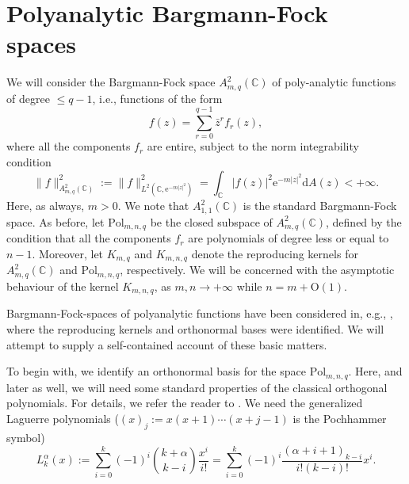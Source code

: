 \documentclass{birkart}
\theoremstyle{definition}
\theoremstyle{remark}
\numberwithin{equation}{section}
\numberwithin{figure}{section}
\newcommand{\e}{\mathrm e}
\newcommand{\1}{{\mathbf 1}}
\newcommand{\Rpar}{q}
\newcommand{\C}{{\mathbb C}}
\newcommand{\Ordo}{\mathrm{O}}
\newcommand{\diff}{{\mathrm d}}
\begin{document}
\section{Polyanalytic Bargmann-Fock spaces}
\label{sec-polybargmann}

We will consider the Bargmann-Fock space $A^2_{m,\Rpar}(\C)$ of poly-analytic 
functions of degree $\le \Rpar-1$, i.e., functions of the form 
\[
f(z) = \sum_{r=0}^{\Rpar-1} \bar{z}^r f_r(z),
\]
where all the components $f_r$ are entire, subject to the norm integrability 
condition 
\[
\|f\|^2_{A^2_{m,\Rpar}(\C)}:=
\|f\|^2_{L^2(\C,\e^{-m|z|^2})}
=\int_{\C} |f(z)|^2 \e^{-m|z|^2} \diff A(z)<+\infty.
\] 
Here, as always, $m>0$. We note that $A^2_{1,1}(\C)$ is the standard 
Bargmann-Fock space. As before, let $\mathrm{Pol}_{m,n,\Rpar}$ be the 
closed subspace of $A^2_{m,\Rpar}(\C)$, defined by the condition that all the 
components $f_r$ are polynomials of degree less or equal to $n-1$.
Moreover, let $K_{m,\Rpar}$ and $K_{m,n,\Rpar}$ denote the reproducing kernels 
for $A^2_{m,\Rpar}(\C)$ and $\mathrm{Pol}_{m,n,\Rpar}$, respectively. 
We will be concerned with the asymptotic behaviour of the kernel 
$K_{m,n,\Rpar}$, as $m,n\to+\infty$ while $n=m+\Ordo(1)$. 

Bargmann-Fock-spaces of polyanalytic functions have been considered in, e.g.,
\cite{vas}, where the reproducing kernels and orthonormal bases were 
identified. We will attempt to supply a self-contained account of these 
basic matters.   

To begin with, we identify an orthonormal basis for the space 
$\mathrm{Pol}_{m,n,\Rpar}$. Here, and later as well, we will need some 
standard properties of the classical orthogonal polynomials. 
For details, we refer the reader to \cite{orthopo}. We need the 
generalized Laguerre polynomials ($(x)_j:=x(x+1)\cdots(x+j-1)$ is the 
Pochhammer symbol)
\[
L^\alpha_k(x):=\sum_{i=0}^{k}(-1)^i\binom{k+\alpha}{k-i}\frac{x^i}{i!}
=\sum_{i=0}^{k}(-1)^i\frac{(\alpha+i+1)_{k-i}}{i!(k-i)!}x^i.
\]
\end{document}
